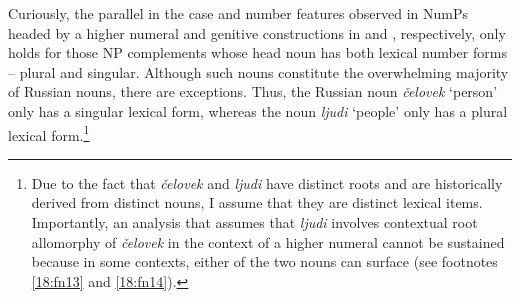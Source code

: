 \documentclass[output=paper,
modfonts,
newtxmath,
hidelinks
]{langscibook}
\begin{document}
\noindent Curiously, the parallel in the case and number features observed in NumPs headed by a higher numeral and genitive constructions in  and , respectively, only holds for those NP complements whose head noun has both lexical number forms – plural and singular. Although such nouns constitute the overwhelming majority of Russian nouns, there are exceptions. Thus, the Russian noun \textit{čelovek} ‘person’ only has a singular lexical form, whereas the noun \textit{ljudi} ‘people’ only has a plural lexical form.\footnote{\label{18:fn2}Due to the fact that \textit{čelovek} and \textit{ljudi} have distinct roots and are historically derived from distinct nouns, I assume that they are distinct lexical items. Importantly, an analysis that assumes that \textit{ljudi} involves contextual root allomorphy of \textit{čelovek} in the context of a higher numeral cannot be sustained because in some contexts, either of the two nouns can surface (see footnotes \ref{18:fn13} and \ref{18:fn14}).
} 
\end{document}
